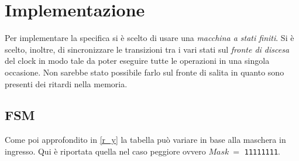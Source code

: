 \documentclass[a4paper]{report}
\begin{document}
\chapter{Implementazione}
Per implementare la specifica si è scelto di usare una {\it macchina a stati finiti}.
Si è scelto, inoltre, di sincronizzare le transizioni tra i vari stati sul {\it fronte di discesa} del clock in modo tale da poter eseguire tutte le operazioni in una singola occasione.
Non sarebbe stato possibile farlo sul fronte di salita in quanto sono presenti dei ritardi nella memoria.
\newpage

\section{FSM}
Come poi approfondito in \ref{r_y} la tabella può variare in base alla maschera in ingresso. Qui è riportata quella nel caso peggiore ovvero $Mask\ =$ \texttt{11111111}.
\end{document}
